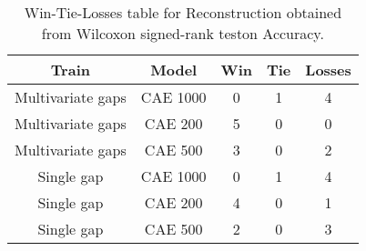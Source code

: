 \begin{table}[H]
\centering
\begin{tabular}{|c|c|c|c|c|}

    \textbf{Train} & \textbf{Model} &  \textbf{Win} &  \textbf{Tie} &  \textbf{Losses} \\
\hline

 Multivariate gaps &       CAE 1000 &             0 &             1 &                4 \\
\hline
 Multivariate gaps &        CAE 200 &             5 &             0 &                0 \\
\hline
 Multivariate gaps &        CAE 500 &             3 &             0 &                2 \\
\hline
        Single gap &       CAE 1000 &             0 &             1 &                4 \\
\hline
        Single gap &        CAE 200 &             4 &             0 &                1 \\
\hline
        Single gap &        CAE 500 &             2 &             0 &                3 \\
\hline

\end{tabular}
\caption{Win-Tie-Losses table for Reconstruction obtained from Wilcoxon signed-rank teston Accuracy.}
\label{tab:reconstruction_model_training_data_comparison}
\end{table}
